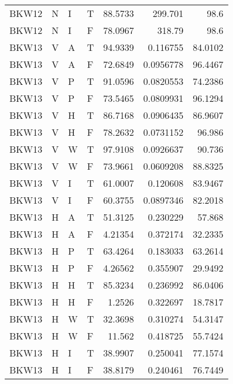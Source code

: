 \begin{longtable}{llllrrr}
    BKW12    & N     & I     & T          & 88.5733    & 299.701     & 98.6     \\
    BKW12    & N     & I     & F          & 78.0967    & 318.79      & 98.6     \\
    BKW13    & V     & A     & T          & 94.9339    & 0.116755    & 84.0102  \\
    BKW13    & V     & A     & F          & 72.6849    & 0.0956778   & 96.4467  \\
    BKW13    & V     & P     & T          & 91.0596    & 0.0820553   & 74.2386  \\
    BKW13    & V     & P     & F          & 73.5465    & 0.0809931   & 96.1294  \\
    BKW13    & V     & H     & T          & 86.7168    & 0.0906435   & 86.9607  \\
    BKW13    & V     & H     & F          & 78.2632    & 0.0731152   & 96.986   \\
    BKW13    & V     & W     & T          & 97.9108    & 0.0926637   & 90.736   \\
    BKW13    & V     & W     & F          & 73.9661    & 0.0609208   & 88.8325  \\
    BKW13    & V     & I     & T          & 61.0007    & 0.120608    & 83.9467  \\
    BKW13    & V     & I     & F          & 60.3755    & 0.0897346   & 82.2018  \\
    BKW13    & H     & A     & T          & 51.3125    & 0.230229    & 57.868   \\
    BKW13    & H     & A     & F          & 4.21354    & 0.372174    & 32.2335  \\
    BKW13    & H     & P     & T          & 63.4264    & 0.183033    & 63.2614  \\
    BKW13    & H     & P     & F          & 4.26562    & 0.355907    & 29.9492  \\
    BKW13    & H     & H     & T          & 85.3234    & 0.236992    & 86.0406  \\
    BKW13    & H     & H     & F          & 1.2526     & 0.322697    & 18.7817  \\
    BKW13    & H     & W     & T          & 32.3698    & 0.310274    & 54.3147  \\
    BKW13    & H     & W     & F          & 11.562     & 0.418725    & 55.7424  \\
    BKW13    & H     & I     & T          & 38.9907    & 0.250041    & 77.1574  \\
    BKW13    & H     & I     & F          & 38.8179    & 0.240461    & 76.7449  \\

\end{longtable}
